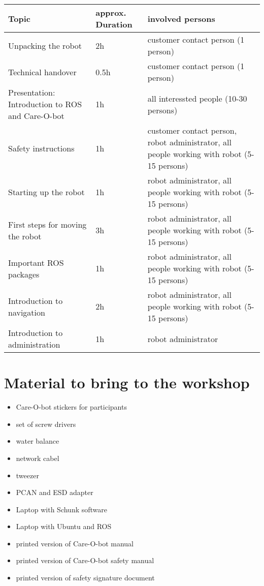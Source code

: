 \documentclass[12pt,twoside]{report}
\begin{document}
\begin{table}[htb]
\begin{tabular}{|l|l|l|}
  \hline
  Topic & approx. Duration & involved persons \\ \hline \hline
  Unpacking the robot & 2h & customer contact person (1 person) \\ \hline
  Technical handover & 0.5h & customer contact person (1 person) \\ \hline
  Presentation: Introduction to ROS and Care-O-bot & 1h & all interessted people (10-30 persons) \\ \hline
  Safety instructions & 1h & customer contact person, robot administrator, all people working with robot (5-15 persons) \\ \hline
  Starting up the robot & 1h & robot administrator, all people working with robot (5-15 persons) \\ \hline
  First steps for moving the robot & 3h & robot administrator, all people working with robot (5-15 persons) \\ \hline
  Important ROS packages & 1h & robot administrator, all people working with robot (5-15 persons) \\ \hline
  Introduction to navigation & 2h & robot administrator, all people working with robot (5-15 persons) \\ \hline
  Introduction to administration & 1h & robot administrator \\ \hline 
  
  
\end{tabular}
\end{table}

\chapter{Material to bring to the workshop}
\begin{itemize}
\item Care-O-bot stickers for participants
\item set of screw drivers
\item water balance
\item network cabel
\item tweezer
\item PCAN and ESD adapter
\item Laptop with Schunk software
\item Laptop with Ubuntu and ROS
\item printed version of Care-O-bot manual
\item printed version of Care-O-bot safety manual
\item printed version of safety signature document
\end{itemize}
\end{document}
